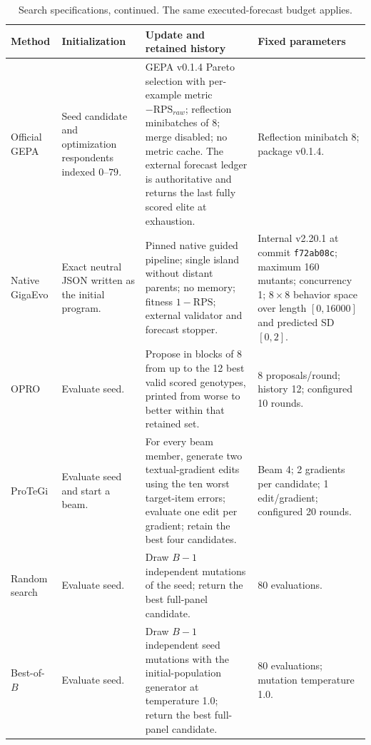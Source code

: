 \begin{table}[H]\centering\small
\caption{Search specifications, continued. The same executed-forecast budget applies.}
\setlength{\tabcolsep}{3pt}
\begin{tabular}{p{}p{}p{}p{}}
\toprule
Method & Initialization & Update and retained history & Fixed parameters \\
\midrule
Official GEPA & Seed candidate and optimization respondents indexed $0$--$79$.
& GEPA v0.1.4 Pareto selection with per-example metric $-\mathrm{RPS}_{raw}$;
reflection minibatches of 8; merge disabled; no metric cache.  The external
forecast ledger is authoritative and returns the last fully scored elite at
exhaustion. & Reflection minibatch 8; package v0.1.4. \\

Native GigaEvo & Exact neutral JSON written as the initial program. & Pinned
native guided pipeline; single island without distant parents; no memory;
fitness $1-\mathrm{RPS}$; external validator and forecast stopper. & Internal
v2.20.1 at commit \texttt{f72ab08c}; maximum 160 mutants; concurrency 1;
$8\times8$ behavior space over length $[0,16000]$ and predicted SD $[0,2]$. \\

OPRO & Evaluate seed. & Propose in blocks of 8 from up to the 12 best valid
scored genotypes, printed from worse to better within that retained set. & 8
proposals/round; history 12; configured 10 rounds. \\

ProTeGi & Evaluate seed and start a beam. & For every beam member, generate two
textual-gradient edits using the ten worst target-item errors; evaluate one
edit per gradient; retain the best four candidates. & Beam 4; 2 gradients per
candidate; 1 edit/gradient; configured 20 rounds. \\

Random search & Evaluate seed. & Draw $B-1$ independent mutations of the seed;
return the best full-panel candidate. & 80 evaluations. \\

Best-of-$B$ & Evaluate seed. & Draw $B-1$ independent seed mutations with the
initial-population generator at temperature 1.0; return the best full-panel
candidate. & 80 evaluations; mutation temperature 1.0. \\
\bottomrule
\end{tabular}
\end{table}

